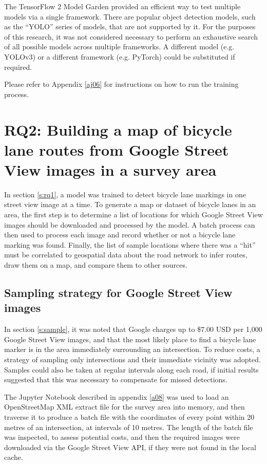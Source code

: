 \documentclass[11pt,twoside]{report}
\begin{document}
The TensorFlow 2 Model Garden provided an efficient way to test multiple models via a single framework.  There are popular object detection models, such as the ``YOLO'' series of models, that are not supported by it.  For the purposes of this research, it was not considered necessary to perform an exhaustive search of all possible models across multiple frameworks.  A different model (e.g. YOLOv3) or a different framework (e.g. PyTorch) could be substituted if required.

Please refer to Appendix \ref{aj06} for instructions on how to run the training process.

\section{RQ2: Building a map of bicycle lane routes from Google Street View images in a survey area}
\label{s:rq2}

In section \ref{s:rq1}, a model was trained to detect bicycle lane markings in one street view image at a time.  To generate a map or dataset of bicycle lanes in an area, the first step is to determine a list of locations for which Google Street View images should be downloaded and processed by the model.  A batch process can then used to process each image and record whether or not a bicycle lane marking was found.  Finally, the list of sample locations where there was a ``hit'' must be correlated to geospatial data about the road network to infer routes, draw them on a map, and compare them to other sources.


\subsection{Sampling strategy for Google Street View images}
\label{s:rq2a}

In section \ref{s:sample}, it was noted that Google charges up to \$7.00 USD per 1,000 Google Street View images, and that the most likely place to find a bicycle lane marker is in the area immediately surrounding an intersection.  To reduce costs, a strategy of sampling only intersections and their immediate vicinity was adopted.  Samples could also be taken at regular intervals along each road, if initial results suggested that this was necessary to compensate for missed detections.

The Jupyter Notebook described in appendix \ref{a08} was used to load an OpenStreetMap XML extract file for the survey area into memory, and then traverse it to produce a batch file with the coordinates of every point within 20 metres of an intersection, at intervals of 10 metres.  The length of the batch file was inspected, to assess potential costs, and then the required images were downloaded via the Google Street View API, if they were not found in the local cache.
\end{document}
